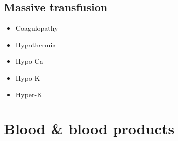 \documentclass[
  14pt,
]{memoir}
\providecommand{\tightlist}{%
  \setlength{\itemsep}{0pt}\setlength{\parskip}{0pt}}
\begin{document}
\hypertarget{massive-transfusion}{%
\subsection{Massive transfusion}\label{massive-transfusion}}

\begin{itemize}
\tightlist
\item
  Coagulopathy
\item
  Hypothermia
\item
  Hypo-Ca
\item
  Hypo-K
\item
  Hyper-K
\end{itemize}

\hypertarget{blood-blood-products}{%
\section{Blood \& blood products}\label{blood-blood-products}}
\end{document}
